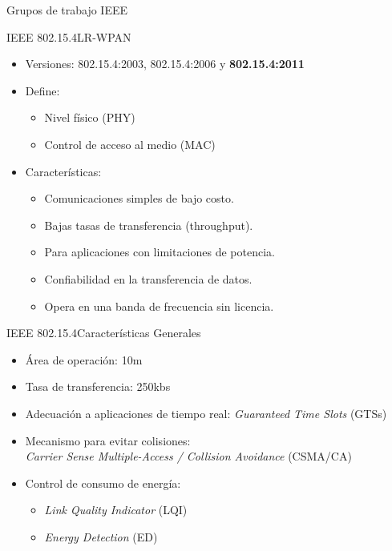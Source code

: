 \documentclass[aspectratio=169]{beamer}
\begin{document}
\begin{frame}{Grupos de trabajo IEEE}
\end{frame}

\begin{frame}{IEEE 802.15.4}{LR-WPAN}
	\begin{itemize}
		\item Versiones: 802.15.4:2003, 802.15.4:2006 y \textbf{802.15.4:2011}
		\vspace{5px}
		\item Define:
		\begin{itemize}
			\item Nivel físico (PHY)
			\item Control de acceso al medio (MAC)
		\end{itemize}
		\vspace{5px}
		\item Características:
		\begin{itemize}
			\item Comunicaciones simples de bajo costo. 
			\item Bajas tasas de transferencia (throughput).
			\item Para aplicaciones con limitaciones de potencia.
			\item Confiabilidad en la transferencia de datos.
			\item Opera en una banda de frecuencia sin licencia.
		\end{itemize}
	\end{itemize}
	
\end{frame}

\begin{frame}{IEEE 802.15.4}{Características Generales}
	
	\begin{itemize}
		\item Área de operación: 10m
		\vspace{5px}
		\item Tasa de transferencia: 250kbs
		\vspace{5px}
		\item Adecuación a aplicaciones de tiempo real: \textit{Guaranteed Time Slots} (GTSs)
		\vspace{5px}
		\item Mecanismo para evitar colisiones:\\ \textit{Carrier Sense Multiple-Access / Collision Avoidance} (CSMA/CA)
		\vspace{5px}
		\item Control de consumo de energía: 
		\begin{itemize}
			\item \textit{Link Quality Indicator} (LQI)
			\item \textit{Energy Detection} (ED)
		\end{itemize}
	\end{itemize}
	
\end{frame}
\end{document}
